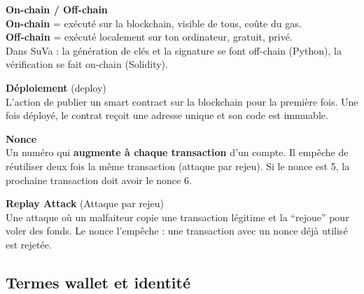 \documentclass[12pt, a4paper]{article}
\begin{document}
\begin{tcolorbox}[colback=gray!4, colframe=gray!50, breakable]
\vspace{0.4cm}

\textbf{On-chain / Off-chain}\\
\hspace*{1em} \textbf{On-chain} = exécuté sur la blockchain, visible de tous, coûte du gas.\\
\hspace*{1em} \textbf{Off-chain} = exécuté localement sur ton ordinateur, gratuit, privé.\\
\hspace*{1em} Dans SuVa : la génération de clés et la signature se font off-chain (Python),
la vérification se fait on-chain (Solidity).

\vspace{0.4cm}

\textbf{Déploiement} (deploy)\\
\hspace*{1em} L'action de publier un smart contract sur la blockchain pour la première fois.
Une fois déployé, le contrat reçoit une adresse unique et son code est immuable.

\vspace{0.4cm}

\textbf{Nonce}\\
\hspace*{1em} Un numéro qui \textbf{augmente à chaque transaction} d'un compte. Il empêche
de réutiliser deux fois la même transaction (attaque par rejeu). Si le nonce est 5, la
prochaine transaction doit avoir le nonce 6.

\vspace{0.4cm}

\textbf{Replay Attack} (Attaque par rejeu)\\
\hspace*{1em} Une attaque où un malfaiteur copie une transaction légitime et la ``rejoue'' pour
voler des fonds. Le nonce l'empêche : une transaction avec un nonce déjà utilisé est rejetée.

\end{tcolorbox}

\vspace{0.4cm}

\subsection{Termes wallet et identité}
\end{document}
